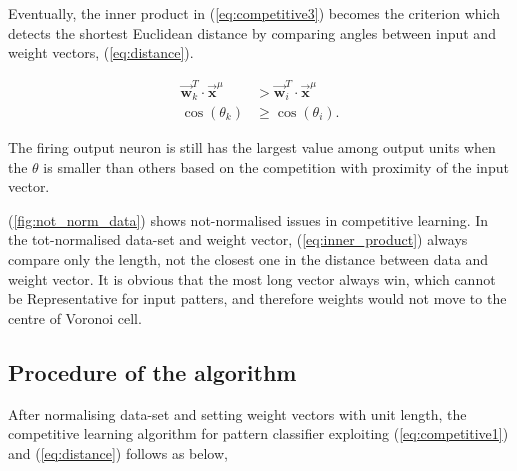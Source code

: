 \documentclass[12pt,a4paper]{report}
\begin{document}
Eventually, the inner product in (\ref{eq:competitive3}) becomes the criterion which detects the shortest Euclidean distance by comparing angles between input and weight vectors, (\ref{eq:distance}).

\begin{equation}\label{eq:distance}
    \begin{split}
        \vec{\mathbf{w}}_k^T \cdot \vec{\mathbf{x}}^\mu &> 
        \vec{\mathbf{w}}_i^T \cdot \vec{\mathbf{x}}^\mu \\
        \cos(\theta_k) &\geq \cos(\theta_i).
    \end{split}
\end{equation}

The firing output neuron is still has the largest value among output units when the $\theta$ is smaller than others based on the competition with proximity of the input vector.

(\ref{fig:not_norm_data}) shows not-normalised issues in competitive learning. In the tot-normalised data-set and weight vector, (\ref{eq:inner_product}) always compare only the length, not the closest one in the distance between data and weight vector. It is obvious that the most long vector always win, which cannot be Representative for input patters, and therefore weights would not move to the centre of Voronoi cell.

\subsection{Procedure of the algorithm}
After normalising data-set and setting weight vectors with unit length, the competitive learning algorithm for pattern classifier exploiting (\ref{eq:competitive1}) and (\ref{eq:distance}) follows as below,
\end{document}
